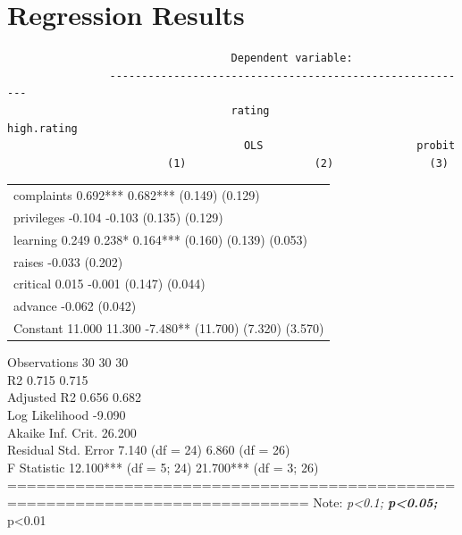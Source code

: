\documentclass[11pt,a4paper,]{article}
\begin{document}
\hypertarget{regression-results}{%
\section{Regression Results}\label{regression-results}}

\begin{verbatim}
                                   Dependent variable:                   
                ---------------------------------------------------------
                                   rating                     high.rating
                                     OLS                        probit   
                         (1)                    (2)               (3)    
\end{verbatim}

\begin{longtable}[]{@{}l@{}}
\toprule
\endhead
\begin{minipage}[t]{0.97\columnwidth}\raggedright
complaints 0.692*** 0.682***
(0.149) (0.129)\strut
\end{minipage}\tabularnewline
\begin{minipage}[t]{0.97\columnwidth}\raggedright
privileges -0.104 -0.103
(0.135) (0.129)\strut
\end{minipage}\tabularnewline
\begin{minipage}[t]{0.97\columnwidth}\raggedright
learning 0.249 0.238* 0.164***
(0.160) (0.139) (0.053)\strut
\end{minipage}\tabularnewline
\begin{minipage}[t]{0.97\columnwidth}\raggedright
raises -0.033
(0.202)\strut
\end{minipage}\tabularnewline
\begin{minipage}[t]{0.97\columnwidth}\raggedright
critical 0.015 -0.001
(0.147) (0.044)\strut
\end{minipage}\tabularnewline
\begin{minipage}[t]{0.97\columnwidth}\raggedright
advance -0.062
(0.042)\strut
\end{minipage}\tabularnewline
\begin{minipage}[t]{0.97\columnwidth}\raggedright
Constant 11.000 11.300 -7.480**
(11.700) (7.320) (3.570)\strut
\end{minipage}\tabularnewline
\bottomrule
\end{longtable}

Observations 30 30 30\\
R2 0.715 0.715\\
Adjusted R2 0.656 0.682\\
Log Likelihood -9.090\\
Akaike Inf. Crit. 26.200\\
Residual Std. Error 7.140 (df = 24) 6.860 (df = 26)\\
F Statistic 12.100*** (df = 5; 24) 21.700*** (df = 3; 26)\\
=============================================================================
Note: \emph{p\textless0.1; \textbf{p\textless0.05; }}p\textless0.01
\end{document}
